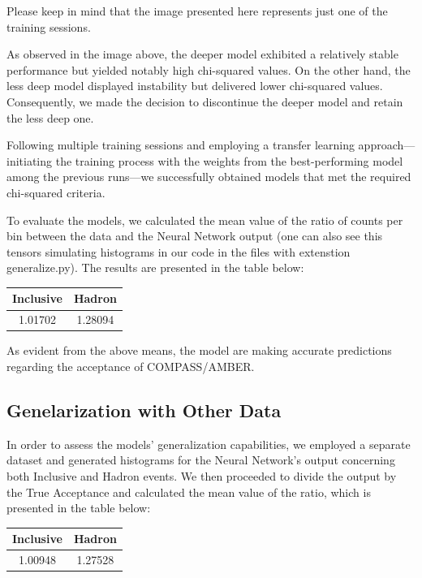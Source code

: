 \documentclass{article}
\begin{document}
Please keep in mind that the image presented here represents just one of the training sessions.

As observed in the image above, the deeper model exhibited a relatively stable performance but yielded notably high chi-squared values. On the other hand, the less deep model displayed instability but delivered lower chi-squared values. Consequently, we made the decision to discontinue the deeper model and retain the less deep one.

Following multiple training sessions and employing a transfer learning approach—initiating the training process with the weights from the best-performing model among the previous runs—we successfully obtained models that met the required chi-squared criteria.

To evaluate the models, we calculated the mean value of the ratio of counts per bin between the data and the Neural Network output (one can also see this tensors simulating histograms in our code in the files with extenstion generalize.py). The results are presented in the table below:

\begin{table}[H]
    \centering
    \begin{tabular}{c|c}
    \textbf{Inclusive} & \textbf{Hadron} \\ \hline
    1.01702 & 1.28094 \\
    \end{tabular}
\end{table}


As evident from the above means, the model are making accurate predictions regarding the acceptance of COMPASS/AMBER.


\subsection{Genelarization with Other Data}
In order to assess the models' generalization capabilities, we employed a separate dataset and generated histograms for the Neural Network's output concerning both Inclusive and Hadron events.
We then proceeded to divide the output by the True Acceptance and calculated the mean value of the ratio, which is presented in the table below:

\begin{table}[H]
    \centering
    \begin{tabular}{c|c}
    \textbf{Inclusive} & \textbf{Hadron} \\ \hline
    1.00948 & 1.27528 \\ 
    \end{tabular}
\end{table}
\end{document}
